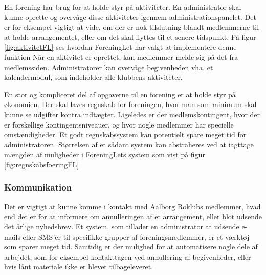 
En forening har brug for at holde styr på aktiviteter. En administrator skal kunne oprette og overvåge disse aktiviteter igennem administrationspanelet. Det er for eksempel vigtigt at vide, om der er nok tilslutning blandt medlemmerne til at holde arrangementet, eller om det skal flyttes til et senere tidspunkt. På figur \ref{fig:aktivitetFL} ses hvordan ForeningLet har valgt at implementere denne funktion
Når en aktivitet er oprettet, kan medlemmer melde sig på det fra medlemssiden. Administratorer kan overvåge begivenheden vha. et kalendermodul, som indeholder alle klubbens aktiviteter.

En stor og kompliceret del af opgaverne til en forening er at holde styr på økonomien. Der skal laves regnskab for foreningen, hvor man som minimum skal kunne se udgifter kontra indtægter. Ligeledes er der medlemskontingent, hvor der er forskellige kontingentsniveauer, og hvor nogle medlemmer har specielle omstændigheder. Et godt regnskabssystem kan potentielt spare meget tid for administratoren.
Størrelsen af et sådant system kan abstraheres ved at iagttage mængden af muligheder i ForeningLets system\cite{ForeningLet} som vist på figur \ref{fig:regnskabsfoeringFL}


\subsubsection{Kommunikation}
Det er vigtigt at kunne komme i kontakt med Aalborg Roklubs medlemmer, hvad end det er for at informere om annulleringen af et arrangement, eller blot udsende det årlige nyhedsbrev. Et system, som tillader en administrator at udsende e-mails eller SMS'er til specifikke grupper af foreningsmedlemmer, er et værktøj som sparer meget tid. Samtidig er der mulighed for at automatisere nogle dele af arbejdet, som for eksempel kontakttagen ved annullering af begivenheder, eller hvis lånt materiale ikke er blevet tilbageleveret.

